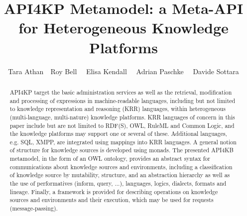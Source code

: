 \documentclass[runningheads]{llncs}
\title{API4KP Metamodel: a Meta-API for Heterogeneous Knowledge Platforms}
\date{}
\begin{document}
%
\author{Tara Athan\ \ Roy Bell \ \ Elisa Kendall \ \ Adrian Paschke \ \ Davide Sottara}

%
\maketitle

\begin{abstract}
API4KP target the basic administration services as well as the retrieval, modification and processing of expressions in machine-readable languages, including but not limited to knowledge representation and reasoning (KRR) languages, within heterogeneous (multi-language, multi-nature) knowledge platforms.
KRR languages of concern in this paper include but are not limited to RDF(S), OWL, RuleML and Common Logic, and the knowledge platforms may support one or several of these.
Additional languages, e.g. SQL, XMPP, are integrated using mappings into KRR languages.
A general notion of structure for knowledge sources is developed using monads.
The presented API4KB metamodel, in the form of an OWL ontology, provides an abstract syntax for communications about knowledge sources and environments, including a classification of knowledge source by mutability, structure, and an abstraction hierarchy as well as the use of performatives (inform, query, ...), languages, logics, dialects, formats and lineage. 
Finally, a framework is provided for describing operations on knowledge sources and environments and their execution, which may be used for requests (message-passing).
\end{abstract}

%
\end{document}

